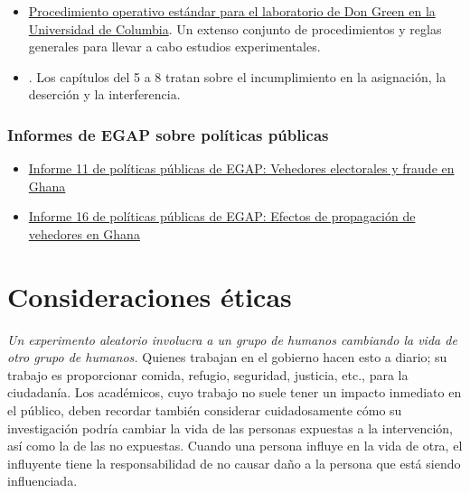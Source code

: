 \documentclass[12pt,spanish,]{book}
\providecommand{\tightlist}{%
  \setlength{\itemsep}{0pt}\setlength{\parskip}{0pt}}
\begin{document}
\begin{itemize}
\tightlist
\item
  \href{https://github.com/acoppock/Green-Lab-SOP}{Procedimiento operativo estándar para el laboratorio de Don Green en la Universidad de Columbia}. Un extenso conjunto de procedimientos y reglas generales para llevar a cabo estudios experimentales.
\item
  \autocite{gerber_field_2012}. Los capítulos del 5 a 8 tratan sobre el incumplimiento en la asignación, la deserción y la interferencia.
\end{itemize}

\hypertarget{informes-de-egap-sobre-poluxedticas-puxfablicas-3}{%
\subsection{Informes de EGAP sobre políticas públicas}\label{informes-de-egap-sobre-poluxedticas-puxfablicas-3}}

\begin{itemize}
\item
  \href{https://egap.org/resource/brief-11-election-observers-and-fraud-in-ghana/}{Informe 11 de políticas públicas de EGAP: Vehedores electorales y fraude en Ghana}
\item
  \href{https://egap.org/resource/brief-16-spillover-effects-of-observers-in-ghana/}{Informe 16 de políticas públicas de EGAP: Efectos de propagación de vehedores en Ghana}
\end{itemize}

\hypertarget{consideraciones-uxe9ticas}{%
\chapter{Consideraciones éticas}\label{consideraciones-uxe9ticas}}

\emph{Un experimento aleatorio involucra a un grupo de humanos cambiando la vida de otro grupo de humanos.} Quienes trabajan en el gobierno hacen esto a diario; su trabajo es proporcionar comida, refugio, seguridad, justicia, etc., para la ciudadanía. Los académicos, cuyo trabajo no suele tener un impacto inmediato en el público, deben recordar también considerar cuidadosamente cómo su investigación podría cambiar la vida de las personas expuestas a la intervención, así como la de las no expuestas. Cuando una persona influye en la vida de otra, el influyente tiene la responsabilidad de no causar daño a la persona que está siendo influenciada.
\end{document}
